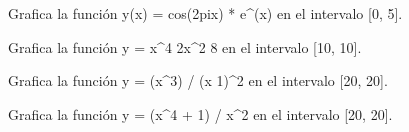 \documentclass[letterpaper,10pt,spanish]{sphinxmanual}
\begin{document}

\begin{fulllineitems}
\label{\detokenize{pr7:pr7.1.grafico_13}}
\pysigstartsignatures
{}
\pysigstopsignatures
\sphinxAtStartPar
Grafica la función y(x) = cos(2pix) * e\textasciicircum{}(\sphinxhyphen{}x) en el intervalo {[}0, 5{]}.

\end{fulllineitems}


\begin{fulllineitems}
\label{\detokenize{pr7:pr7.1.grafico_2}}
\pysigstartsignatures
{}
\pysigstopsignatures
\sphinxAtStartPar
Grafica la función y = x\textasciicircum{}4 \sphinxhyphen{} 2x\textasciicircum{}2 \sphinxhyphen{} 8 en el intervalo {[}\sphinxhyphen{}10, 10{]}.

\end{fulllineitems}


\begin{fulllineitems}
\label{\detokenize{pr7:pr7.1.grafico_3}}
\pysigstartsignatures
{}
\pysigstopsignatures
\sphinxAtStartPar
Grafica la función y = (x\textasciicircum{}3) / (x \sphinxhyphen{} 1)\textasciicircum{}2 en el intervalo {[}\sphinxhyphen{}20, 20{]}.

\end{fulllineitems}


\begin{fulllineitems}
\label{\detokenize{pr7:pr7.1.grafico_4}}
\pysigstartsignatures
{}
\pysigstopsignatures
\sphinxAtStartPar
Grafica la función y = (x\textasciicircum{}4 + 1) / x\textasciicircum{}2 en el intervalo {[}\sphinxhyphen{}20, 20{]}.

\end{fulllineitems}
\end{document}
